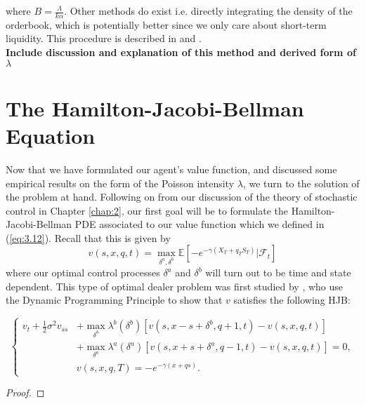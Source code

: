 where $B=\frac{\Lambda}{k\alpha}$.
Other methods do exist i.e. directly integrating the density of the 
orderbook, which is potentially better since we only care about 
short-term liquidity. This procedure is described in \cite{Weber2005}
and \cite{Smith2003}.\\
\textbf{Include discussion and explanation of this method and derived form of $\lambda$}

\newpage
\section{The Hamilton-Jacobi-Bellman Equation}\label{sec:3.7}

Now that we have formulated our agent's value function, and discussed 
some empirical results on the form of the Poisson intensity $\lambda$,
we turn to the solution of the problem at hand. Following on from our 
discussion of the theory of stochastic control in Chapter \ref{chap:2},
our first goal will be to formulate the Hamilton-Jacobi-Bellman PDE
associated to our value function which we defined in (\ref{eq:3.12}).
Recall that this is given by
\begin{equation}
    v(s,x,q,t)=\max\limits_{\delta^a,\delta^b}\mathbb{E}\left[-e^{-\gamma(X_T+q_TS_T)}|\mathcal{F}_t\right]
\end{equation}
where our optimal control processes $\delta^a$ and $\delta^b$ will
turn out to be time and state dependent. This type of optimal dealer 
problem was first studied by \cite{HS1981}, who use the Dynamic Programming 
Principle to show that $v$ satisfies the following HJB:
\begin{theorem}
    \begin{equation}\label{eq:3.17}
        \left\{
            \begin{aligned}
                v_t+\frac{1}{2}\sigma^2v_{ss}&+\max\limits_{\delta^b}\lambda^b(\delta^b)[v(s,x-s+\delta^b,q+1,t)-v(s,x,q,t)]\\
                &+\max\limits_{\delta^a}\lambda^a(\delta^a)[v(s,x+s+\delta^a,q-1,t)-v(s,x,q,t)]=0,\\
                &v(s,x,q,T)=-e^{-\gamma(x+qs)}.
            \end{aligned}
        \right.
    \end{equation}
\end{theorem}
\begin{proof}
    
\end{proof}

